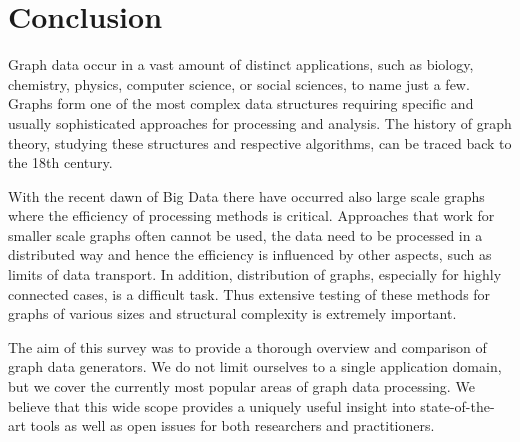 \section{Conclusion}
\label{sec:conclusion}

Graph data occur in a vast amount of distinct applications, such as biology, chemistry, physics, computer science, or social sciences, to name just a few. Graphs form one of the most complex data structures requiring specific and usually sophisticated approaches for processing and analysis. The history of graph theory, studying these structures and respective algorithms, can be traced back to the 18th century.
 
With the recent dawn of Big Data there have occurred also large scale graphs where the efficiency   of  processing methods is critical.  Approaches that work for smaller scale graphs often cannot be used, the data need to be processed in a distributed way and hence the efficiency is influenced by other aspects, such as limits of data transport. In addition, distribution of graphs, especially for highly connected cases, is a difficult task. Thus extensive testing of these methods for graphs of various sizes and structural complexity is extremely important.

The aim of this survey was to provide a thorough overview and comparison of graph data generators. We do not limit ourselves to a single application domain, but we cover the currently most popular areas of graph data processing. We believe that this wide scope provides a uniquely useful insight into state-of-the-art tools as well as open issues for both researchers and practitioners.
 